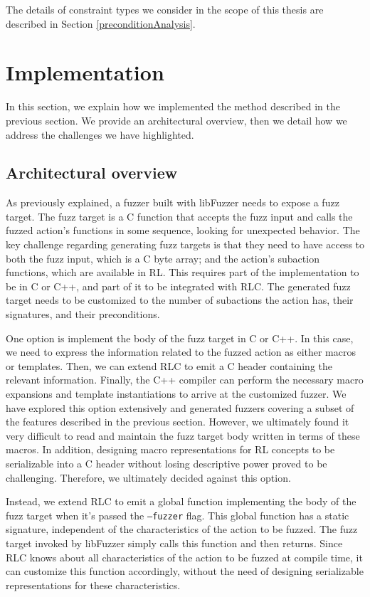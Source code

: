The details of constraint types we consider in the scope of this thesis are described in Section \ref{preconditionAnalysis}. 

\section{Implementation}
In this section, we explain how we implemented the method described in the previous section.
We provide an architectural overview, then we detail how we address the challenges we have highlighted.

\subsection{Architectural overview}
As previously explained, a fuzzer built with libFuzzer needs to expose a fuzz target.
The fuzz target is a C function that accepts the fuzz input and calls the fuzzed action's functions in some sequence, looking for unexpected behavior.
The key challenge regarding generating fuzz targets is that they need to have access to both the fuzz input, which is a C byte array; and the action's subaction functions, which are available in RL.
This requires part of the implementation to be in C or C++, and part of it to be integrated with RLC.
The generated fuzz target needs to be customized to the number of subactions the action has, their signatures, and their preconditions.

One option is implement the body of the fuzz target in C or C++.
In this case, we need to express the information related to the fuzzed action as either macros or templates.
Then, we can extend RLC to emit a C header containing the relevant information.
Finally, the C++ compiler can perform the necessary macro expansions and template instantiations to arrive at the customized fuzzer.
We have explored this option extensively and generated fuzzers covering a subset of the features described in the previous section.
However, we ultimately found it very difficult to read and maintain the fuzz target body written in terms of these macros.
In addition, designing macro representations for RL concepts to be serializable into a C header without losing descriptive power proved to be challenging.
Therefore, we ultimately decided against this option.

Instead, we extend RLC to emit a global function implementing the body of the fuzz target when it's passed the \texttt{--fuzzer} flag.
This global function has a static signature, independent of the characteristics of the action to be fuzzed.
The fuzz target invoked by libFuzzer simply calls this function and then returns.
Since RLC knows about all characteristics of the action to be fuzzed at compile time, it can customize this function accordingly, without the need of designing serializable representations for these characteristics.

